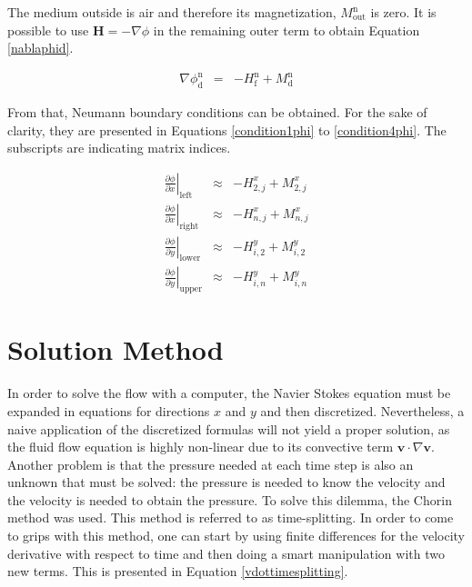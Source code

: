 \documentclass[journal]{IEEEtran}
\begin{document}
The medium outside is air and therefore its magnetization, $M_{\mathrm{out}}^{\mathrm{n}}$ is zero. It is possible to use $\mathbf{H} = -\nabla \phi$ in the remaining outer term to obtain Equation \ref{nablaphid}.

\begin{eqnarray}
\nabla\phi_{\mathrm{d}}^{\mathrm{n}} & = & -H_{\mathrm{f}}^{\mathrm{n}} + M_{\mathrm{d}}^{\mathrm{n}} \label{nablaphid}
\end{eqnarray}

From that, Neumann boundary conditions can be obtained. For the sake of clarity, they are presented in Equations \ref{condition1phi} to \ref{condition4phi}. The subscripts are indicating matrix indices.

\begin{eqnarray}
\left.\frac{\partial \phi}{\partial x}\right|_{\mathrm{left}}\;\;&\approx&- H^{x}_{2,j} + M^{x}_{2,j}\label{condition1phi}\\
\left.\frac{\partial \phi}{\partial x}\right|_{\mathrm{right}}&\approx&- H^{x}_{n,j} + M^{x}_{n,j}\\
\left.\frac{\partial \phi}{\partial y}\right|_{\mathrm{lower}}&\approx&- H^{y}_{i,2} + M^{y}_{i,2}\\
\left.\frac{\partial \phi}{\partial y}\right|_{\mathrm{upper}}&\approx&- H^{y}_{i,n} + M^{y}_{i,n}\label{condition4phi}
\end{eqnarray}

\section{Solution Method}
In order to solve the flow with a computer, the Navier Stokes equation must be expanded in equations for directions $x$ and $y$ and then discretized. Nevertheless, a naive application of the discretized formulas will not yield a proper solution, as the fluid flow equation is highly non-linear due to its convective term $\mathbf{v}\cdot \nabla \mathbf{v}$. Another problem is that the pressure needed at each time step is also an unknown that must be solved: the pressure is needed to know the velocity and the velocity is needed to obtain the pressure. To solve this dilemma, the Chorin method \cite{Chorin1997118} was used. This method is referred to as time-splitting. In order to come to grips with this method, one can start by using finite differences for the velocity derivative with respect to time and then doing a smart manipulation with two new terms. This is presented in Equation \ref{vdottimesplitting}.
\end{document}
